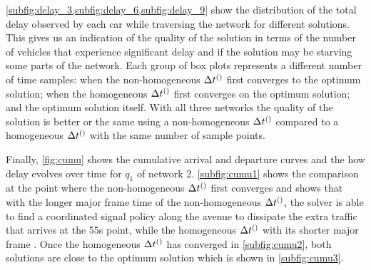 \cref{subfig:delay_3,subfig:delay_6,subfig:delay_9} show the distribution of the
total delay observed by each car while traversing the network for different
solutions. This gives us an indication of the quality of the solution in terms
of the number of vehicles that experience significant delay and if the solution
may be starving some parts of the network.  Each group of box plots represents a
different number of time samples: when the non-homogeneous $\DT[]$ first converges to
the optimum solution; when the homogeneous $\DT[]$ first converges on the
optimum solution; and the optimum solution itself. With all three networks the
quality of the solution is better or  the same using a non-homogeneous $\DT[]$
compared to a homogeneous $\DT[]$ with the same number of sample
points.

Finally, \cref{fig:cumu} shows the cumulative arrival and departure curves and
the how delay evolves over time for $q_1$ of network 2.  \cref{subfig:cumu1}
shows the comparison at the point where the non-homogeneous $\DT[]$ first
converges and shows that with the longer major frame time of the
non-homogeneous $\DT[]$, the solver is able to find a coordinated signal policy
along the avenue to dissipate the extra traffic that arrives at the 55s point,
while the homogeneous $\DT[]$ with its shorter major frame . Once the homogeneous $\DT[]$ has
converged in \cref{subfig:cumu2}, both solutions are close to the optimum
solution which is shown in \cref{subfig:cumu3}.

